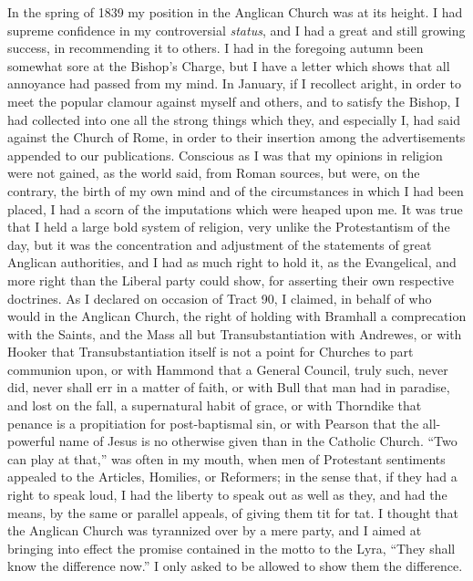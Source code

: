 In the spring of 1839 my position in the Anglican Church was at its
height. I had supreme confidence in my controversial \emph{status}, and
I had a great and still growing success, in recommending it to others. I
had in the foregoing autumn been somewhat sore at the Bishop's Charge,
but I have a letter which shows that all annoyance had passed from my
mind. In January, if I recollect aright, in order to meet the popular
clamour against myself and others, and to satisfy the Bishop, I had
collected into one all the strong things which they, and especially I,
had said against the Church of Rome, in order to their insertion among
the advertisements appended to our publications. Conscious as I was that
my opinions in religion were not gained, as the world said, from Roman
sources, but were, on the contrary, the birth of my own mind and of the
circumstances in which I had been placed, I had a scorn of the
imputations which were heaped upon me. It was true that I held a large
bold system of religion, very unlike the Protestantism of the day, but
it was the concentration and adjustment of the statements of great
Anglican authorities, and I had as much right to hold it, as the
Evangelical, and more right than the Liberal party could
show, for asserting their own respective doctrines. As I declared on occasion of Tract 90, I claimed, in behalf of who would
in the Anglican Church, the right of holding
with Bramhall a comprecation with the Saints, and the
Mass all but Transubstantiation with Andrewes, or with Hooker that
Transubstantiation itself is not a point for Churches to part
communion upon, or with Hammond that a General Council, truly such,
never did, never shall err in a matter of faith, or with Bull that man had in paradise, and lost
on the fall, a supernatural habit of grace, or
with Thorndike that penance is a propitiation for post-baptismal sin, or
with Pearson that the all-powerful name of Jesus is no otherwise given
than in the Catholic Church. ``Two can play at that,'' was often
in my mouth, when men of Protestant sentiments appealed to the Articles,
Homilies, or Reformers; in the sense that, if they had a right to speak
loud, I had the liberty to speak out as well as they, and had the means, by the same or parallel appeals, of
giving them tit for tat. I thought that the Anglican Church was tyrannized over by a
mere party, and I aimed at
bringing into effect the promise contained in the motto to the Lyra,
``They shall know the difference now.'' I only asked to be
allowed to show them the difference.

